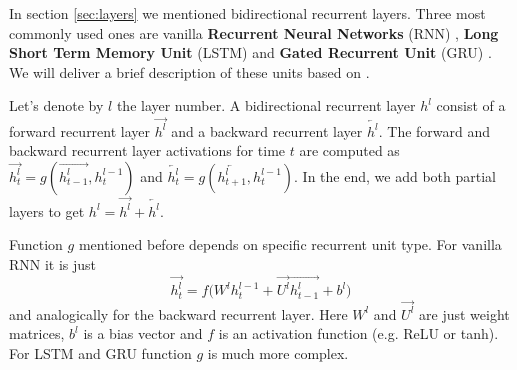 \documentclass[licencjacka,en]{pracamgr}
\begin{document}
	\lstm
	
	In section \ref{sec:layers} we mentioned bidirectional recurrent layers. Three most commonly used ones are vanilla \textbf{Recurrent Neural Networks} (RNN) \cite{RNN}, \textbf{Long Short Term Memory Unit} (LSTM) \cite{LSTM} and \textbf{Gated Recurrent Unit} (GRU) \cite{GRU}. We will deliver a brief description of these units based on \cite{DS2}.
	
	Let's denote by $l$ the layer number. A bidirectional recurrent layer $h^l$ consist of a forward recurrent layer $\overrightarrow{h^l}$ and a backward recurrent layer $\overleftarrow{h^l}$. The forward and backward recurrent layer activations for time $t$ are computed as $\overrightarrow{h^l_t} = g(\overrightarrow{h^l_{t - 1}}, h^{l-1}_t)$ and $\overleftarrow{h^l_t} = g(\overleftarrow{h^l_{t+1}}, h^{l-1}_t)$. In the end, we add both partial layers to get $h^l = \overrightarrow{h^l} + \overleftarrow{h^l}$.
	
	Function $g$ mentioned before depends on specific recurrent unit type. For vanilla RNN it is just
	$$\overrightarrow{h^l_t} = f\big(W^l h^{l-1}_t + \overrightarrow{U^l} \overrightarrow{h^l_{t - 1}} + b^l\big)$$
	and analogically for the backward recurrent layer. Here $W^l$ and $\overrightarrow{U^l}$ are just weight matrices, $b^l$ is a bias vector and $f$ is an activation function (e.g. ReLU or tanh). For LSTM and GRU function $g$ is much more complex.
	
\end{document}
